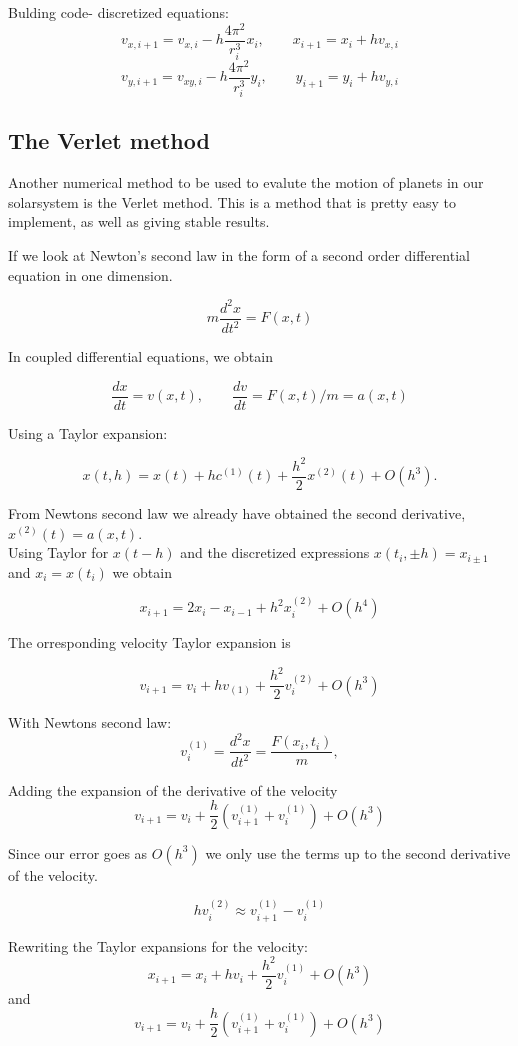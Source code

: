 \documentclass[../main.tex]{subfiles}
\begin{document}
Bulding code- discretized equations:
$$v_{x,i+1} = v_{x,i} - h \frac{4\pi^2}{r_i^3}x_i,\qquad x_{i+1} = x_{i} + hv_{x,i}$$
$$v_{y,i+1} = v_{xy,i} - h \frac{4\pi^2}{r_i^3}y_i,\qquad y_{i+1} = y_{i} + hv_{y,i}$$

\subsection{The Verlet method}
Another numerical method to be used to evalute the motion of planets in our solarsystem is the Verlet method. This is a method that is pretty easy to implement, as well as giving stable results.

If we look at Newton's second law in the form of a second order differential equation in one dimension.

 $$m \frac{d^2x}{dt^2} = F(x,t)$$


In coupled differential equations, we obtain

$$\frac{dx}{dt} = v(x,t),\qquad \frac{dv}{dt} = F(x,t)/m = a(x,t)$$

Using a Taylor expansion:

 $$x(t,h) = x(t) + hc^{(1)}(t) + \frac{h^2}{2}x^{(2)}(t) + O(h^3).$$


From Newtons second law we already have obtained the second derivative, $x^{(2)}(t) = a(x,t)$. \\
Using Taylor for $x(t-h)$ and the discretized expressions $x(t_i,\pm h) = x_{i \pm 1}$ and $x_i = x(t_i)$ we obtain

$$x_{i+1} = 2x_i - x_{i-1} + h^2 x_i^{(2)} + O(h^4)$$

The orresponding velocity Taylor expansion is

$$v_{i+1} = v_i + hv_{(1)} + \frac{h^2}{2} v_i^{(2)} + O(h^3)$$

With Newtons second law:
$$v_i^{(1)} = \frac{d^2x}{dt^2} = \frac{F(x_i, t_i)}{m},$$

Adding the expansion of the derivative of the velocity
$$v_{i+1} = v_i + \frac{h}{2}\left(v_{i+1}^{(1)} + v_i^{(1)}\right) + O(h^3)$$

Since our error goes as $O(h^3)$ we only use the terms up to the second derivative of the velocity.

$$hv_i^{(2)}\approx v_{i+1}^{(1)} - v_i^{(1)}$$

Rewriting the Taylor expansions for the velocity:
$$x_{i+1} = x_i + hv_i + \frac{h^2}{2} v_i^{(1)} + O(h^3)$$
and
$$v_{i+1} = v_i + \frac{h}{2} \left(v_{i+1}^{(1)} + v_i^{(1)}\right) + O(h^3)$$
\end{document}

